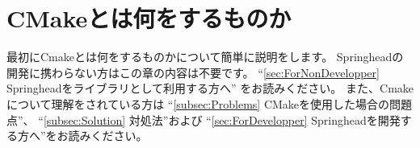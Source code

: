 \newpage
\section{CMakeとは何をするものか}
\label{sec:WhatCMakeWillDo}

\def\Anno#1{\rm{\footnotesize{ \CDots\  #1}}}
\ifLwarp
\def\SolutionFile{ソリューションファイル$(\dagger 1)$}
\def\ProjectFile{プロジェクトファイル$(\dagger 2)$}
\else
\def\SolutionFile{\hbox{ソリューションファイル{\small{$^{(\dagger 1)}$}}}}
\def\ProjectFile{\hbox{プロジェクトファイル{\small{$^{(\dagger 2)}$}}}}
\fi
\def\cmake{\tt{cmake}}
\def\make{\tt{make}}
\def\SprLib{Springheadライブラリ}
\def\SprProj{Springheadプロジェクト}
\def\VS{Visual Studio}

\def\SprTop#1{\Path{C:/Springhead{#1}}}
\def\AppTop#1{\Path{C:/Develop/Application{#1}}}
\def\build{{\it{build\/}}}

\def\CMakeLists#1{\Path{CMakeLists.txt{#1}}}
\def\CMakeOpts#1{\Path{CMakeOpts.txt{#1}}}
\def\CMakeConf#1{\Path{CMakeConf.txt{#1}}}
\def\CMakeTopdir#1{\Path{CMakeTopdir.txt{#1}}}

\def\thinrule#1{\makebox[#1][l]{\vrule width #1 height 0.1pt}}

\ifLwarp
\def\UpKQs{``}
\def\UpKQe{''}
\def\KQuote#1{``#1''}
\fi

\noindent
最初にCmakeとは何をするものかについて簡単に説明をします。
Springheadの開発に携わらない方はこの章の内容は不要です。
\UpKQs \ref{sec:ForNonDevelopper} Springheadをライブラリとして利用する方へ\UpKQe
をお読みください。
また、Cmakeについて理解をされている方は
\UpKQs \ref{subsec:Problems} CMakeを使用した場合の問題点\UpKQe、
\UpKQs \ref{subsec:Solution} 対処法\UpKQe および
\UpKQs \ref{sec:ForDevelopper} Springheadを開発する方へ\UpKQe をお読みください。

